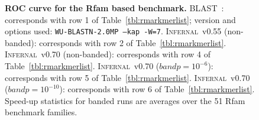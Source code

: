 \documentclass[11pt]{article}
\def\infernal{\textsc{Infernal}~}
\def\blast{\textsc{BLAST}~}
\begin{document}
\begin{figure}
\begin{center}
\end{center}
\caption{\textbf{ROC curve for the Rfam based benchmark.}
\blast: corresponds with row 1 of Table~\ref{tbl:rmarkmerlist};
version and options used: \texttt{WU-BLASTN-2.0MP --kap -W=7}. 
\infernal v0.55 (non-banded): corresponds with row 2 of Table~\ref{tbl:rmarkmerlist}.
\infernal v0.70 (non-banded): corresponds with row 4 of Table~\ref{tbl:rmarkmerlist}.
\infernal v0.70 ($bandp=10^{-6}$): corresponds with row 5 of Table~\ref{tbl:rmarkmerlist}.
\infernal v0.70 ($bandp=10^{-10}$): corresponds with row 6 of Table~\ref{tbl:rmarkmerlist}.
 Speed-up statistics for banded runs are averages over the 51 Rfam
benchmark families.}
\label{fig:roc}
\end{figure}
\end{document}
